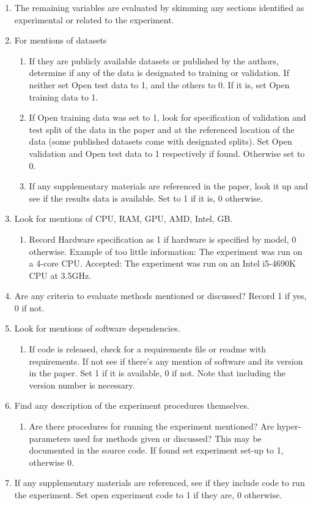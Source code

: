 \begin{enumerate}
\begin{enumerate}
    \end{enumerate}
\item The remaining variables are evaluated by skimming any sections identified as experimental or related to the experiment.
\item For mentions of datasets
    \begin{enumerate}
    \item If they are publicly available datasets or published by the authors, determine if any of the data is designated to training or validation. If neither set Open test data to 1, and the others to 0. If it is, set Open training data to 1.
    \item If Open training data was set to 1, look for specification of validation and test split of the data in the paper and at the referenced location of the data (some published datasets come with designated splits). Set Open validation and Open test data to 1 respectively if found. Otherwise set to 0.
    \item If any supplementary materials are referenced in the paper, look it up and see if the results data is available. Set to 1 if it is, 0 otherwise.
    \end{enumerate}
\item Look for mentions of CPU, RAM, GPU, AMD, Intel, GB.
    \begin{enumerate}
    \item Record Hardware specification as 1 if hardware is specified by model, 0 otherwise.
    Example of too little information: The experiment was run on a 4-core CPU. Accepted: The experiment was run on an Intel i5-4690K CPU at 3.5GHz.
    \end{enumerate}
\item Are any criteria to evaluate methods mentioned or discussed? Record 1 if yes, 0 if not.
\item Look for mentions of software dependencies.
    \begin{enumerate}
    \item If code is released, check for a requirements file or readme with requirements. If not see if there's any mention of software and its version in the paper. Set 1 if it is available, 0 if not. Note that including the version number is necessary.
    \end{enumerate}
\item Find any description of the experiment procedures themselves.
    \begin{enumerate}
    \item Are there procedures for running the experiment mentioned? Are hyper-parameters used for methods given or discussed? This may be documented in the source code. If found set experiment set-up to 1, otherwise 0.
    \end{enumerate}
\item If any supplementary materials are referenced, see if they include code to run the experiment. Set open experiment code to 1 if they are, 0 otherwise.
\end{enumerate}


